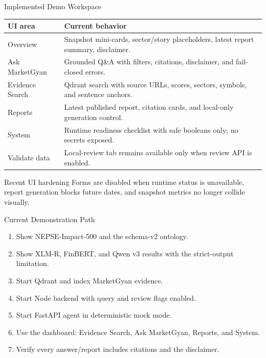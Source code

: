 \documentclass[aspectratio=169,11pt,hyperref={bookmarks=false}]{beamer}
\newcommand{\smallsep}{\vspace{0.35em}}
\begin{document}
\begin{frame}{Implemented Demo Workspace}
  \small
  \begin{tabularx}{\textwidth}{@{}p{}X@{}}
    \toprule
    UI area & Current behavior \\
    \midrule
    Overview & Snapshot mini-cards, sector/story placeholders, latest report summary, disclaimer. \\
    Ask MarketGyan & Grounded Q\&A with filters, citations, disclaimer, and fail-closed errors. \\
    Evidence Search & Qdrant search with source URLs, scores, sectors, symbols, and sentence anchors. \\
    Reports & Latest published report, citation cards, and local-only generation control. \\
    System & Runtime readiness checklist with safe booleans only; no secrets exposed. \\
    Validate data & Local-review tab remains available only when review API is enabled. \\
    \bottomrule
  \end{tabularx}
  \smallsep
  \begin{block}{Recent UI hardening}
    Forms are disabled when runtime status is unavailable, report generation blocks future dates, and snapshot metrics no longer collide visually.
  \end{block}
\end{frame}

\begin{frame}{Current Demonstration Path}
  \begin{enumerate}
    \item Show NEPSE-Impact-500 and the schema-v2 ontology.
    \item Show XLM-R, FinBERT, and Qwen v3 results with the strict-output limitation.
    \item Start Qdrant and index MarketGyan evidence.
    \item Start Node backend with query and review flags enabled.
    \item Start FastAPI agent in deterministic mock mode.
    \item Use the dashboard: Evidence Search, Ask MarketGyan, Reports, and System.
    \item Verify every answer/report includes citations and the disclaimer.
  \end{enumerate}
\end{frame}
\end{document}
